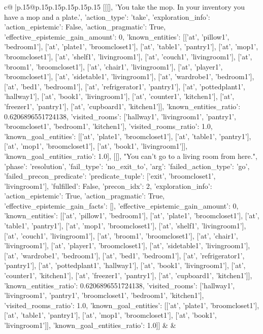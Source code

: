 \documentclass{article}
\begin{document}
{\begin{supertabular}{c@{$\;$}|p{.15\linewidth}@{}p{.15\linewidth}p{.15\linewidth}p{.15\linewidth}p{.15\linewidth}p{.15\linewidth}}
{{{	 [[[], 'You take the mop. In your inventory you have a mop and a plate.', {'action_type': 'take', 'exploration_info': {'action_epistemic': False, 'action_pragmatic': True, 'effective_epistemic_gain_amount': 0, 'known_entities': [['at', 'pillow1', 'bedroom1'], ['at', 'plate1', 'broomcloset1'], ['at', 'table1', 'pantry1'], ['at', 'mop1', 'broomcloset1'], ['at', 'shelf1', 'livingroom1'], ['at', 'couch1', 'livingroom1'], ['at', 'broom1', 'broomcloset1'], ['at', 'chair1', 'livingroom1'], ['at', 'player1', 'broomcloset1'], ['at', 'sidetable1', 'livingroom1'], ['at', 'wardrobe1', 'bedroom1'], ['at', 'bed1', 'bedroom1'], ['at', 'refrigerator1', 'pantry1'], ['at', 'pottedplant1', 'hallway1'], ['at', 'book1', 'livingroom1'], ['at', 'counter1', 'kitchen1'], ['at', 'freezer1', 'pantry1'], ['at', 'cupboard1', 'kitchen1']], 'known_entities_ratio': 0.6206896551724138, 'visited_rooms': ['hallway1', 'livingroom1', 'pantry1', 'broomcloset1', 'bedroom1', 'kitchen1'], 'visited_rooms_ratio': 1.0, 'known_goal_entities': [['at', 'plate1', 'broomcloset1'], ['at', 'table1', 'pantry1'], ['at', 'mop1', 'broomcloset1'], ['at', 'book1', 'livingroom1']], 'known_goal_entities_ratio': 1.0}}], [[], "You can't go to a living room from here.", {'phase': 'resolution', 'fail_type': 'no_exit_to', 'arg': {'failed_action_type': 'go', 'failed_precon_predicate': {'predicate_tuple': ['exit', 'broomcloset1', 'livingroom1'], 'fulfilled': False, 'precon_idx': 2}}, 'exploration_info': {'action_epistemic': True, 'action_pragmatic': True, 'effective_epistemic_gain_facts': [], 'effective_epistemic_gain_amount': 0, 'known_entities': [['at', 'pillow1', 'bedroom1'], ['at', 'plate1', 'broomcloset1'], ['at', 'table1', 'pantry1'], ['at', 'mop1', 'broomcloset1'], ['at', 'shelf1', 'livingroom1'], ['at', 'couch1', 'livingroom1'], ['at', 'broom1', 'broomcloset1'], ['at', 'chair1', 'livingroom1'], ['at', 'player1', 'broomcloset1'], ['at', 'sidetable1', 'livingroom1'], ['at', 'wardrobe1', 'bedroom1'], ['at', 'bed1', 'bedroom1'], ['at', 'refrigerator1', 'pantry1'], ['at', 'pottedplant1', 'hallway1'], ['at', 'book1', 'livingroom1'], ['at', 'counter1', 'kitchen1'], ['at', 'freezer1', 'pantry1'], ['at', 'cupboard1', 'kitchen1']], 'known_entities_ratio': 0.6206896551724138, 'visited_rooms': ['hallway1', 'livingroom1', 'pantry1', 'broomcloset1', 'bedroom1', 'kitchen1'], 'visited_rooms_ratio': 1.0, 'known_goal_entities': [['at', 'plate1', 'broomcloset1'], ['at', 'table1', 'pantry1'], ['at', 'mop1', 'broomcloset1'], ['at', 'book1', 'livingroom1']], 'known_goal_entities_ratio': 1.0}}]] 
	  } 
	   } 
	   } 
	 & & \\ 
 


\end{supertabular}}
\end{document}
